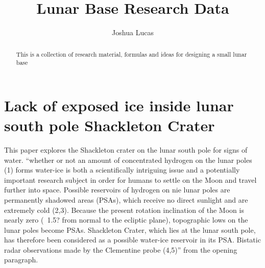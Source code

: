 \documentclass[prl,onecolumn]{revtex4-1}  %
\begin{document}

\title{ Lunar Base Research Data }

\author{Joshua Lucas}








\begin{abstract}
This is a collection of research material, formulas and ideas for designing a small lunar base
\end{abstract}
 

\maketitle %

\section{Lack of exposed ice inside lunar south pole Shackleton Crater}
This paper explores the Shackleton crater on the lunar south pole for signs of water.
``whether or not an amount of concentrated hydrogen on the lunar poles (1) forms water-ice is both a scientifically intriguing issue and a potentially important research subject in order for humans to settle on the Moon and travel further into space. Possible reservoirs of hydrogen on nie lunar poles are permanently shadowed areas (PSAs), which receive no direct sunlight and are extremely cold (2,3). Because the present rotation inclination of the Moon is nearly zero (~1.5? from normal to the ecliptic plane), topographic lows on the lunar poles become PSAs. Shackleton Crater, which lies at the lunar south pole, has therefore been considered as a possible water-ice reservoir in its PSA. Bistatic radar observations made by the Clementine probe (4,5)'' from the opening paragraph. \citep{Haruyama}
\end{document}
